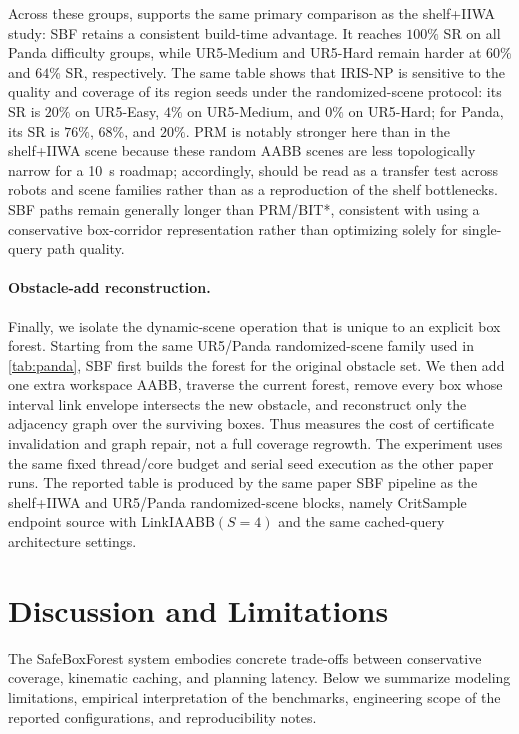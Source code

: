 \documentclass[journal]{IEEEtran}
\begin{document}
Across these groups,  supports the same primary comparison as
the shelf+IIWA study: SBF retains a consistent build-time advantage. It
reaches $100\%$ SR on all Panda difficulty groups, while UR5-Medium and
UR5-Hard remain harder at $60\%$ and $64\%$ SR, respectively. The same table
shows that IRIS-NP is sensitive to the quality and coverage of its region seeds
under the randomized-scene protocol: its SR is $20\%$ on UR5-Easy, $4\%$ on
UR5-Medium, and $0\%$ on UR5-Hard; for Panda, its SR is $76\%$, $68\%$, and
$20\%$. PRM is notably stronger here than in the shelf+IIWA scene because these
random AABB scenes are less topologically narrow for a 10~s roadmap;
accordingly,  should be read as a transfer test across robots
and scene families rather than as a reproduction of the shelf bottlenecks. SBF
paths remain generally longer than PRM/BIT*, consistent with using a
conservative box-corridor representation rather than optimizing solely for
single-query path quality.

\paragraph{Obstacle-add reconstruction.}
Finally, we isolate the dynamic-scene operation that is unique to an explicit
box forest. Starting from the same UR5/Panda randomized-scene family used in
\cref{tab:panda}, SBF first builds the forest for the original obstacle set. We
then add one extra workspace AABB,
traverse the current forest, remove every box whose interval link envelope
intersects the new obstacle, and reconstruct only the adjacency graph over the
surviving boxes. Thus  measures the cost of certificate
invalidation and graph repair, not a full coverage regrowth. The experiment
uses the same fixed thread/core budget and serial seed execution as the other
paper runs. The reported table is produced by the same paper SBF pipeline as the
shelf+IIWA and UR5/Panda randomized-scene blocks, namely CritSample endpoint source with
LinkIAABB$(S=4)$ and the same cached-query architecture settings.




\section{Discussion and Limitations}\label{sec:discussion}

The SafeBoxForest system embodies concrete trade-offs between conservative
coverage, kinematic caching, and planning latency. Below we summarize modeling
limitations, empirical interpretation of the benchmarks, engineering scope of the
reported configurations, and reproducibility notes.
\end{document}
